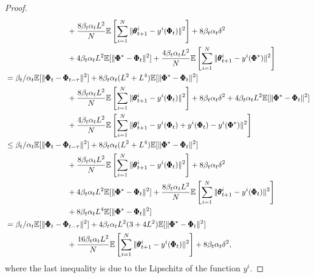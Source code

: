 \documentclass{article} %
\theoremstyle{plain}
\theoremstyle{definition}
\theoremstyle{remark}
\begin{document}
{\begin{proof}
\begin{align*}
     &\qquad\qquad\qquad\qquad+\frac{8\beta_t
     \alpha_t L^2}{N}\mathbb{E}\left[\sum_{i=1}^N\|\pmb{\theta}_{t+1}^i-y^i(\pmb{\Phi}_t)\|^2\right]+8\beta_t\alpha_t\delta^2\allowdisplaybreaks\\
     &\qquad\qquad\qquad\qquad +4\beta_t\alpha_t L^2 \mathbb{E}[\|\pmb{\Phi}^*-\pmb{\Phi}_t\|^2]+\frac{4\beta_t\alpha_t L^2}{N}\mathbb{E}\left[\sum_{i=1}^N\|\pmb{\theta}^i_{t+1}-y^i(\pmb{\Phi}^*)\|^2\right]\allowdisplaybreaks\\
     & = \beta_t/\alpha_t\mathbb{E}[\|\pmb{\Phi}_t-\pmb{\Phi}_{t-\tau}\|^2] +8\beta_t \alpha_t (L^2+L^4)\mathbb{E}[\|\pmb{\Phi}^*-\pmb{\Phi}_t\|^2]\nonumber\allowdisplaybreaks\\
     &\qquad\qquad\qquad\qquad+\frac{8\beta_t
     \alpha_t L^2}{N}\mathbb{E}\left[\sum_{i=1}^N\|\pmb{\theta}_{t+1}^i-y^i(\pmb{\Phi}_t)\|^2\right]+8\beta_t\alpha_t\delta^2+4\beta_t\alpha_t L^2 \mathbb{E}[\|\pmb{\Phi}^*-\pmb{\Phi}_t\|^2]\allowdisplaybreaks\\
     &\qquad\qquad\qquad\qquad +\frac{4\beta_t\alpha_t L^2}{N}\mathbb{E}\left[\sum_{i=1}^N\|\pmb{\theta}^i_{t+1}-y^i(\pmb{\Phi}_t)+y^i(\pmb{\Phi}_t)-y^i(\pmb{\Phi}^*)\|^2\right]\allowdisplaybreaks\\
     &\leq \beta_t/\alpha_t\mathbb{E}[\|\pmb{\Phi}_t-\pmb{\Phi}_{t-\tau}\|^2] +8\beta_t \alpha_t (L^2+L^4)\mathbb{E}[\|\pmb{\Phi}^*-\pmb{\Phi}_t\|^2]\nonumber\allowdisplaybreaks\\
     &\qquad\qquad\qquad\qquad+\frac{8\beta_t
     \alpha_t L^2}{N}\mathbb{E}\left[\sum_{i=1}^N\|\pmb{\theta}_{t+1}^i-y^i(\pmb{\Phi}_t)\|^2\right]+8\beta_t\alpha_t\delta^2\allowdisplaybreaks\\
     &\qquad\qquad\qquad\qquad+4\beta_t\alpha_t L^2 \mathbb{E}[\|\pmb{\Phi}^*-\pmb{\Phi}_t\|^2]+\frac{8\beta_t\alpha_t L^2}{N}\mathbb{E}\left[\sum_{i=1}^N\|\pmb{\theta}^i_{t+1}-y^i(\pmb{\Phi}_t)\|^2\right]\allowdisplaybreaks\\
     &\qquad\qquad\qquad\qquad+8\beta_t\alpha_tL^4\mathbb{E}[\|\pmb{\Phi}^*-\pmb{\Phi}_t\|^2]\allowdisplaybreaks\\
     &=\beta_t/\alpha_t\mathbb{E}[\|\pmb{\Phi}_t-\pmb{\Phi}_{t-\tau}\|^2] +4\beta_t \alpha_tL^2 (3+4L^2)\mathbb{E}[\|\pmb{\Phi}^*-\pmb{\Phi}_t\|^2]\nonumber\allowdisplaybreaks\\
     &\qquad\qquad\qquad\qquad+\frac{16\beta_t
     \alpha_t L^2}{N}\mathbb{E}\left[\sum_{i=1}^N\|\pmb{\theta}_{t+1}^i-y^i(\pmb{\Phi}_t)\|^2\right]+8\beta_t\alpha_t\delta^2,
\end{align*}
where the last inequality is due to the Lipschitz of the function $y^i$.


\end{proof}}
\end{document}

